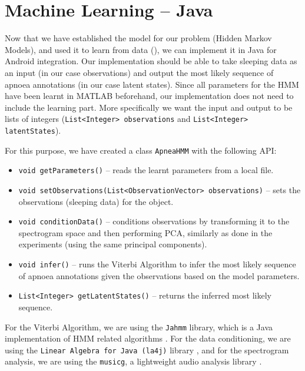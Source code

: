 \section{Machine Learning -- Java}
\label{sec:mljava}

Now that we have established the model for our problem (Hidden Markov Models), and used it to learn from data (), we can implement it in Java for Android integration. Our implementation should be able to take sleeping data as an input (in our case observations) and output the most likely sequence of apnoea annotations (in our case latent states). Since all parameters for the HMM have been learnt in MATLAB beforehand, our implementation does not need to include the learning part. More specifically we want the input and output to be lists of integers (\verb!List<Integer> observations! and \verb!List<Integer> latentStates!).

For this purpose, we have created a class \verb!ApneaHMM! with the following API:
\begin{itemize}
	\item \verb!void getParameters()! -- reads the learnt parameters from a local file.
	\item \verb!void setObservations(List<ObservationVector> observations)! -- sets the observations (sleeping data) for the object.
	\item \verb!void conditionData()! -- conditions observations by transforming it to the spectrogram space and then performing PCA, similarly as done in the experiments (using the same principal components).
	\item \verb!void infer()! -- runs the Viterbi Algorithm to infer the most likely sequence of apnoea annotations given the observations based on the model parameters.
	\item \verb!List<Integer> getLatentStates()! -- returns the inferred most likely sequence.
\end{itemize}

For the Viterbi Algorithm, we are using the \verb!Jahmm! library, which is a Java implementation of HMM related algorithms \cite{jahmm}. For the data conditioning, we are using the \verb!Linear Algebra for Java (la4j)! library \cite{la4j}, and for the spectrogram analysis, we are using the \verb!musicg!, a lightweight audio analysis library \cite{musicg}. 